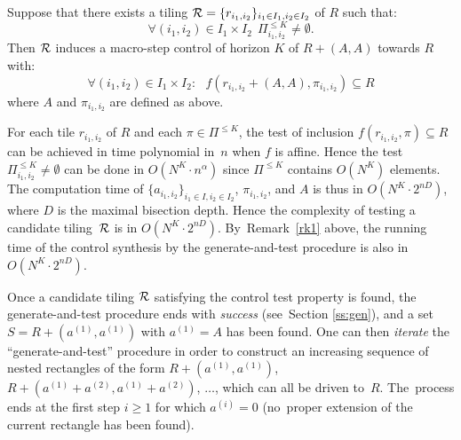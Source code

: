 \begin{proposition}
%
Suppose that there exists a tiling 
${\cal R}=\{r_{i_1,i_2}\}_{i_1\in I_1, i_2\in I_2}$ of $R$ such that:
%
$$\forall (i_1,i_2)\in I_1\times I_2\ \ \Pi_{i_1,i_2}^{\leq K}\neq \emptyset.$$
%
Then ${\cal R}$ induces
a macro-step control
of horizon $K$ of $R+(A,A)$ towards $R$ with:
%
$$\forall (i_1,i_2)\in I_1\times I_2:\ 
\ \ f(r_{i_1,i_2}+(A,A),\pi_{i_1,i_2})\subseteq  R$$
%
where $A$ and $\pi_{i_1,i_2}$ are defined as above.
\end{proposition}



For each tile $r_{i_1,i_2}$ of $R$ and each $\pi\in\Pi^{\leq K}$, the
test of inclusion ${f(r_{i_1,i_2},\pi)\subseteq R}$ can be achieved in
time polynomial in~$n$ when $f$ is affine.
%
Hence the test $\Pi_{i_1,i_2}^{\leq K}\neq\emptyset$
can be done in $O(N^K \cdot n^{\alpha})$  
since $\Pi^{\leq K}$ contains $O(N^K)$ elements.
%
%
The computation time of $\{a_{i_1,i_2}\}_{i_1\in I,i_2\in I_2}$, $\pi_{i_1,i_2}$,
and $A$ is thus in $O(N^K \cdot 2^{nD})$, where $D$ is the maximal 
bisection depth.
Hence the complexity of testing
a candidate tiling~${\cal R}$ is in $O(N^K \cdot 2^{nD})$.
By~Remark~\ref{rk1} above, the running time of the 
control synthesis by the generate-and-test procedure is also in 
$O(N^K \cdot 2^{nD})$.
%



Once a candidate tiling ${\cal R}$ satisfying the control test
property is found, the generate-and-test procedure ends with
\emph{success} (see~Section \ref{ss:gen}), and a set
$S=R+(a^{(1)},a^{(1)})$ with $a^{(1)}=A$ has been found.  One can then
\emph{iterate} the ``generate-and-test'' procedure in order to
construct an increasing sequence of nested rectangles of the form
$R+(a^{(1)},a^{(1)})$, $R+(a^{(1)}+a^{(2)},a^{(1)}+a^{(2)})$, $\dots$,
which can all be driven to~$R$. The~process ends at the first step $i\geq 1$ 
for which $a^{(i)}=0$ (no~proper extension of the current
rectangle has been found).




